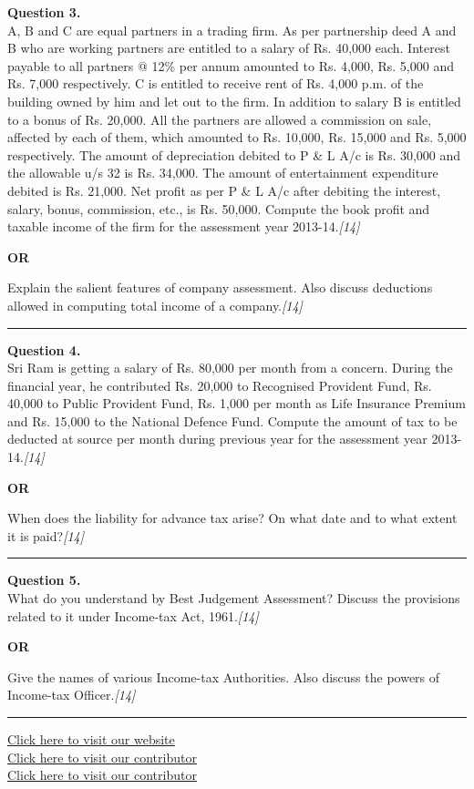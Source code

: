 \documentclass[11pt,a4paper]{article}
\newcommand{\pts}[1]{\hfill   \textit{[#1]}}
\begin{document}
\noindent   \textbf{Question 3.} \\
A, B and C are equal partners in a trading firm. As per partnership deed A and B who are working partners are entitled to a salary of Rs. 40,000 each. Interest payable to all partners @ 12\% per annum amounted to Rs. 4,000, Rs. 5,000 and Rs. 7,000 respectively. C is entitled to receive rent of Rs. 4,000 p.m. of the building owned by him and let out to the firm. In addition to salary B is entitled to a bonus of Rs. 20,000. All the partners are allowed a commission on sale, affected by each of them, which amounted to Rs. 10,000, Rs. 15,000 and Rs. 5,000 respectively. The amount of depreciation debited to P \& L A/c is Rs. 30,000 and the allowable u/s 32 is Rs. 34,000. The amount of entertainment expenditure debited is Rs. 21,000. Net profit as per P \& L A/c after debiting the interest, salary, bonus, commission, etc., is Rs. 50,000.
\smallskip
Compute the book profit and taxable income of the firm for the assessment year 2013-14.\pts{14}

\centerline{   \textbf{OR}}

Explain the salient features of company assessment. Also discuss deductions allowed in computing total income of a company.\pts{14}

\medskip\rule{\linewidth}{0.2pt}




\noindent   \textbf{Question 4.} \\
Sri Ram is getting a salary of Rs. 80,000 per month from a concern. During the financial year, he contributed Rs. 20,000 to Recognised Provident Fund, Rs. 40,000 to Public Provident Fund, Rs. 1,000 per month as Life Insurance Premium and Rs. 15,000 to the National Defence Fund.
\smallskip
Compute the amount of tax to be deducted at source per month during previous year for the assessment year 2013-14.\pts{14}

\centerline{   \textbf{OR}}

When does the liability for advance tax arise? On what date and to what extent it is paid?\pts{14}

\medskip\rule{\linewidth}{0.2pt}




\noindent   \textbf{Question 5.} \\
What do you understand by Best Judgement Assessment? Discuss the provisions related to it under Income-tax Act, 1961.\pts{14}

\centerline{   \textbf{OR}}

Give the names of various Income-tax Authorities. Also discuss the powers of Income-tax Officer.\pts{14}

\vfill
\rule{\linewidth}{0.4pt}

\begin{center}\small
\href{https://bhu-exam.vercel.app/}{Click here to visit our website}\\[4pt]
\href{https://me-aryan.vercel.app/}{Click here to visit our contributor}\\[4pt]
\href{https://quashan-me.vercel.app/}{Click here to visit our contributor}
\end{center}
\end{document}
